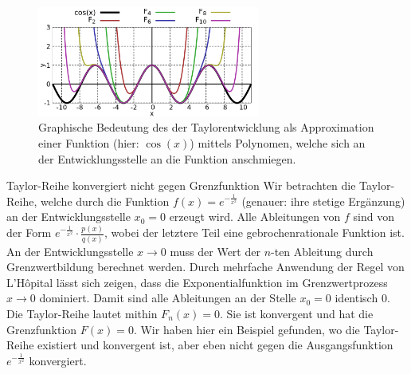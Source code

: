 \begin{figure}
    \centering
    \includegraphics[width=0.65\textwidth]{./gnuplot/taylor-approximation}
    \caption{Graphische Bedeutung des der Taylorentwicklung als Approximation einer Funktion (hier: $\cos(x)$) mittels Polynomen, welche sich an der Entwicklungsstelle an die Funktion anschmiegen.}
    \label{fig:GraphTaylor}
\end{figure}

\begin{example}{Taylor-Reihe konvergiert nicht gegen Grenzfunktion}
    Wir betrachten die Taylor-Reihe, welche durch die Funktion $f(x) = e^{-\frac{1}{x^2}}$ (genauer: ihre stetige Ergänzung) an der Entwicklungsstelle $x_0=0$ erzeugt wird. Alle Ableitungen von $f$ sind von der Form $e^{-\frac{1}{x^2}} \cdot \frac{p(x)}{q(x)}$, wobei der letztere Teil eine gebrochenrationale Funktion ist. An der Entwicklungsstelle $x\to 0$ muss der Wert der $n$-ten Ableitung durch Grenzwertbildung berechnet werden. Durch mehrfache Anwendung der Regel von L'Hôpital lässt sich zeigen, dass die Exponentialfunktion im Grenzwertprozess $x\to 0$ dominiert. Damit sind alle Ableitungen an der Stelle $x_0=0$ identisch $0$. Die Taylor-Reihe lautet mithin $F_n(x) = 0$. Sie ist konvergent und hat die Grenzfunktion $F(x) = 0$. Wir haben hier ein Beispiel gefunden, wo die Taylor-Reihe existiert und konvergent ist, aber eben nicht gegen die Ausgangsfunktion $e^{-\frac{1}{x^2}}$ konvergiert.
\end{example}

